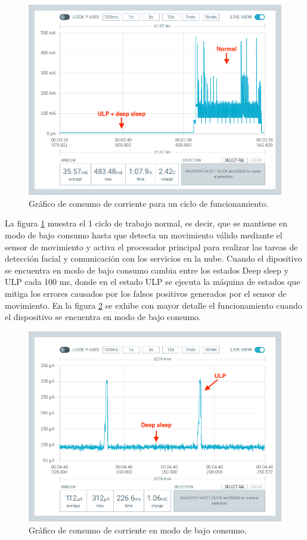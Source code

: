 \begin{figure}[h]
	\centering
	\includegraphics[scale=0.45]{./Figures/test_ulp1.png}
	\caption{Gráfico de consumo de corriente para un ciclo de funcionamiento.}
	\label{fig:test_ulp1}
\end{figure}

La figura \ref{fig:test_ulp1} muestra el 1 ciclo de trabajo normal, es decir, que se mantiene en modo de bajo consumo hasta que detecta un movimiento válido mediante el sensor de movimiento y activa el procesador principal para realizar las tareas de detección facial y comunicación con los servicios en la nube. Cuando el dipositivo se encuentra en modo de bajo consumo cambia entre los estados Deep sleep y ULP cada 100 ms, donde en el estado ULP se ejecuta la máquina de estados que mitiga los errores causados por los falsos positivos generados por el sensor de movimiento. En la figura \ref{fig:test_ulp2} se exhibe con mayor detalle el funcionamiento cuando el dispositivo se encuentra en modo de bajo consumo.

\clearpage


\begin{figure}[h]
	\centering
	\includegraphics[scale=0.45]{./Figures/test_ulp2.png}
	\caption{Gráfico de consumo de corriente en modo de bajo consumo.}
	\label{fig:test_ulp2}
\end{figure}

